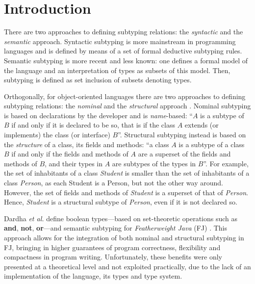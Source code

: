 \documentclass[runningheads]{llncs}
\begin{document}
\section{Introduction}
\label{sec:intro}
There are two approaches to defining subtyping relations: the \emph{syntactic} and the \emph{semantic} approach.
Syntactic subtyping \cite{Liskov1994} is more mainstream in programming languages and is defined by means of a set of formal deductive subtyping rules.
Semantic subtyping \cite{Castagna2005,Cas05,Frisch2008} is more recent and less known:  one defines a formal model of the language and an interpretation of types as subsets of this model.
Then, subtyping is defined as set inclusion of subsets denoting types.

Orthogonally, for object-oriented languages there are two approaches to defining subtyping relations: the \emph{nominal} and the \emph{structural} approach \cite{Integrating,Useful}.
Nominal subtyping is based on {declarations} by the developer and is \emph{name}-based: ``$A$ is a subtype of $B$ if and only if it is declared to be so, that is if the class $A$ extends (or implements) the class (or interface) $B$''.
Structural subtyping instead is based on the \emph{structure} of a class, its fields and methods: ``a class $A$ is a subtype of a class $B$ if and only if the fields and methods of $A$ are a superset of the fields and methods of $B$, and their types in $A$ are subtypes of the types in $B$''.
For example, the set of inhabitants of a class \emph{Student} is smaller than the set of inhabitants of a class \emph{Person}, as each Student is a Person, but not the other way around.
However, the set of fields and methods of \emph{Student} is a superset of that of \emph{Person}.
Hence, \emph{Student} is a structural subtype of \emph{Person}, even if it is not declared so.


Dardha \emph{et al.} \cite{Dardha2013,Dardha2017} define boolean types---based on set-theoretic operations such as \textbf{and}, \textbf{not}, \textbf{or}---and semantic subtyping for \emph{Featherweight Java} (FJ) \cite{featherweight}.
This approach allows for the integration of both nominal and structural subtyping in FJ, bringing in higher guarantees of program correctness, flexibility and compactness in program writing.
Unfortunately, these benefits were only presented at a theoretical level and not exploited practically, due to the lack of an implementation of the language, its types and type system.
\end{document}
